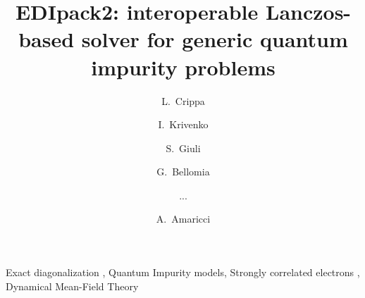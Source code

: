 \documentclass[preprint,3p,10pt]{elsarticle}
\begin{document}
\begin{frontmatter}

\title{EDIpack2: interoperable Lanczos-based solver for generic quantum impurity problems}
\author[a,b,c]{L.~Crippa}
\author[a]{I.~Krivenko}
\author[d]{S.~Giuli}
\author[d]{G.~Bellomia}
\author[a,d,c,d,e,f,g,h,i]{...}
\author[i]{A.~Amaricci}

\newcommand{\CNRIOM}{CNR-IOM, Istituto Officina dei Materiali,
  Consiglio Nazionale delle Ricerche, Via Bonomea 265, 34136
  Trieste, Italy}
\newcommand{\SISSA}{Scuola Internazionale Superiore di Studi Avanzati (SISSA),
  Via Bonomea 265, 34136 Trieste, Italy}
\newcommand{\ITPHamburg}{I. Institute of Theoretical Physics,
  University of Hamburg, Notkestrasse 9, 22607 Hamburg, Germany}
\newcommand{\WZBURG}{Institut f\"ur Theoretische Physik und
  Astrophysik,Universit\"at W\"urzburg, 97074 W\"urzburg, Germany}
\newcommand{\CTQMAT}{W\"urzburg-Dresden Cluster of Excellence ct.qmat, 01062 Dresden, Germany}
\newcommand{\Geneve}{Department of Quantum Matter Physics, University of
  Geneva, Quai Ernest-Ansermet 24, 1211 Geneva, Switzerland}
\newcommand{\UPISA}{Department of Physics ``E. Fermi'' University of
  Pisa, Largo B. Pontecorvo 3, 56127 Pisa, Italy}
\newcommand{\ESPCI}{LPEM, ESPCI Paris, PSL Research University, CNRS, Sorbonne Universit\'e, 75005 Paris, France}

\address[a]{\ITPHamburg}
\address[b]{\CTQMAT}
\address[c]{\WZBURG}
\address[d]{\SISSA}
\address[e]{Politecnico di Torino, Turin, Italy}
\address[f]{\Geneve}
\address[g]{\UPISA}
\address[h]{\ESPCI}
\address[i]{\CNRIOM}

\begin{abstract}
  
\end{abstract}

\begin{keyword}
  Exact diagonalization \sep
  Quantum Impurity models\sep  
  Strongly correlated electrons \sep  
  Dynamical Mean-Field Theory
\end{keyword}

\end{frontmatter}
\end{document}

